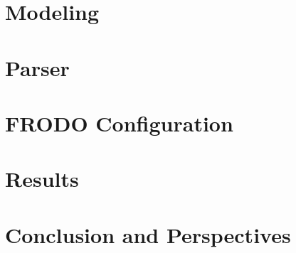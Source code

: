 \documentclass{article}
\begin{document}
	\section{Modeling}
	
	\section{Parser}
	\section{FRODO Configuration}
	\section{Results}
	\section{Conclusion and Perspectives}
	\newpage
	
	
\end{document}

